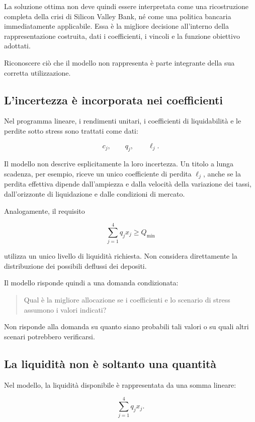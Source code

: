 La soluzione ottima non deve quindi essere interpretata come una
ricostruzione completa della crisi di Silicon Valley Bank, n\'e come una
politica bancaria immediatamente applicabile. Essa \`e la migliore decisione
all'interno della rappresentazione costruita, dati i coefficienti, i vincoli e
la funzione obiettivo adottati.

Riconoscere ci\`o che il modello non rappresenta \`e parte integrante della
sua corretta utilizzazione.

\subsection{L'incertezza \`e incorporata nei coefficienti}

Nel programma lineare, i rendimenti unitari, i coefficienti di liquidabilit\`a
e le perdite sotto stress sono trattati come dati:

\[
c_j,
\qquad
q_j,
\qquad
\ell_j.
\]

Il modello non descrive esplicitamente la loro incertezza. Un titolo a lunga
scadenza, per esempio, riceve un unico coefficiente di perdita
\(\ell_j\), anche se la perdita effettiva dipende dall'ampiezza e dalla
velocit\`a della variazione dei tassi, dall'orizzonte di liquidazione e dalle
condizioni di mercato.

Analogamente, il requisito

\[
\sum_{j=1}^{4}q_jx_j\geq Q_{\min}
\]

\noindent utilizza un unico livello di liquidit\`a richiesta. Non considera direttamente
la distribuzione dei possibili deflussi dei depositi.

Il modello risponde quindi a una domanda condizionata:

\begin{quote}
Qual \`e la migliore allocazione se i coefficienti e lo scenario di stress
assumono i valori indicati?
\end{quote}

Non risponde alla domanda su quanto siano probabili tali valori o su quali
altri scenari potrebbero verificarsi.

\subsection{La liquidit\`a non \`e soltanto una quantit\`a}

Nel modello, la liquidit\`a disponibile \`e rappresentata da una somma
lineare:

\[
\sum_{j=1}^{4}q_jx_j.
\]

